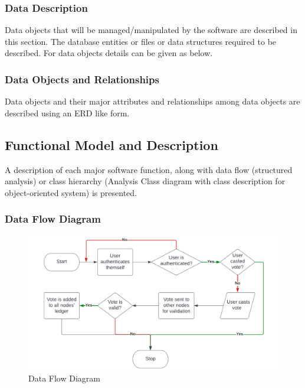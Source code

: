\documentclass[oneside, 12pt]{book}
\begin{document}
\subsubsection{Data Description}
Data objects that will be managed/manipulated by the software are described in this section. The database entities or files or data structures required to be described. For data objects details can be given as below.
\subsubsection{Data Objects and Relationships}
Data objects and their major attributes and relationships among data objects are described using an ERD like form.
\subsection{Functional Model and Description}
A description of each major software function, along with data flow (structured analysis) or class hierarchy (Analysis Class diagram with class description for object-oriented system) is presented.
\subsubsection{Data Flow Diagram}
\begin{figure}[H]
	\centering
	\includegraphics[width=\linewidth]{./Resources/data-flow.png}
	\caption{Data Flow Diagram}
	\label{fig:data-flow}
\end{figure}
\end{document}
